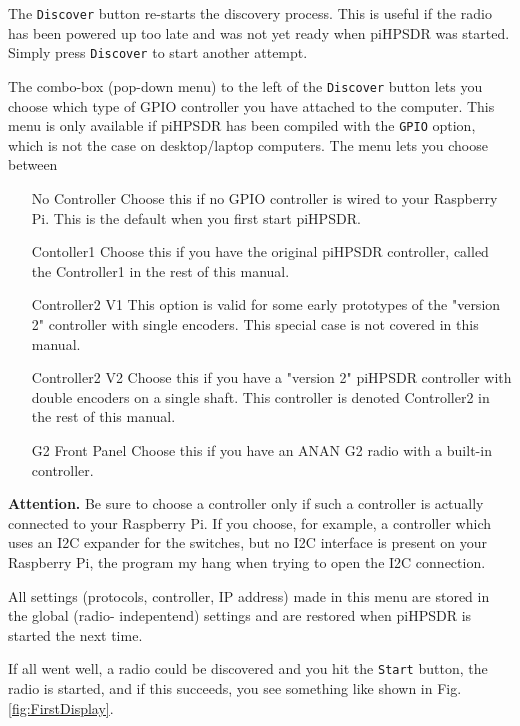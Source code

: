\documentclass[12pt]{book}
\def\rett#1{\texttt{\color{red}#1}}
\begin{document}
The \rett{Discover} button re-starts the discovery process. This is useful if the radio has been powered up
too late and
was not yet ready when piHPSDR was started. Simply press \rett{Discover} to start another attempt.

The combo-box (pop-down menu) to the left of the \rett{Discover} button lets you choose which type of GPIO
controller you
have attached to the computer. This menu is only available if piHPSDR has been compiled with the
\texttt{GPIO} option, which
is not the case on desktop/laptop computers. The menu lets you choose between

\begin{itemize}[font=\texttt, left=80pt]
\item[No Controller]{Choose this if no GPIO controller is wired to your Raspberry Pi. This is the default
when you first start piHPSDR.}
\item[Contoller1]{Choose this if you have the original piHPSDR controller, called the Controller1 in the rest
of this manual.}
\item[Controller2 V1]{This option is valid for some early prototypes of the "version 2" controller with
single encoders. This special case is not covered in this manual.}
\item[Controller2 V2]{Choose this if you have a "version 2" piHPSDR controller with double encoders
on a single shaft.
This controller is denoted Controller2 in the rest of this manual.}
\item[G2 Front Panel]{Choose this if you have an ANAN G2 radio with a built-in controller.}
\end{itemize}

\textbf{Attention.} Be sure to choose a controller only if such a controller is actually connected to your
Raspberry Pi. If
you choose, for example, a controller which uses an I2C expander for the switches, but no I2C interface is
present on
your Raspberry Pi, the program my hang when trying to open the I2C connection.

All settings (protocols, controller, IP address) made in this menu are stored in the global (radio-
indepentend) settings
and are restored when piHPSDR is started the next time.

If all went well, a radio could be discovered and you hit the \rett{Start} button, the radio is started, and
if this succeeds, you see something like shown in Fig. \ref{fig:FirstDisplay}.
\end{document}

